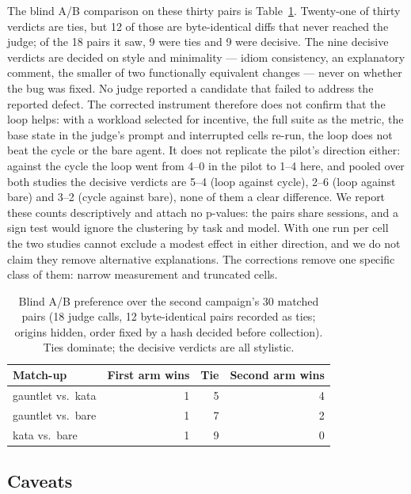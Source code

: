 \documentclass{sbc2019}%
\begin{document}
The blind A/B comparison on these thirty pairs is
Table~\ref{tab:gauntlet-ab-campaign}. Twenty-one of thirty verdicts are ties, but 12 of those are
byte-identical diffs that never reached the judge; of the 18 pairs it saw,
9 were ties and 9 were decisive. The nine decisive verdicts are decided on style and minimality --- idiom
consistency, an explanatory comment, the smaller of two functionally
equivalent changes --- never on whether the bug was fixed. No judge reported a
candidate that failed to address the reported defect. The corrected instrument
therefore does not confirm that the loop helps: with a workload selected for
incentive, the full suite as the metric, the base state in the judge's prompt
and interrupted cells re-run, the loop does not beat the cycle or the bare
agent. It does not replicate the pilot's direction either: against the cycle
the loop went from 4--0 in the pilot to 1--4 here, and pooled over both
studies the decisive verdicts are 5--4 (loop against cycle), 2--6 (loop
against bare) and 3--2 (cycle against bare), none of them a clear
difference. We report these counts descriptively and attach no p-values: the
pairs share sessions, and a sign test would ignore the clustering by task and
model. With one run per cell the
two studies cannot exclude a modest effect in either direction, and we do not
claim they remove alternative explanations. The corrections remove one
specific class of them: narrow measurement and truncated cells.

\begin{table}[!ht]
\caption{Blind A/B preference over the second campaign's 30 matched pairs (18
judge calls, 12 byte-identical pairs recorded as ties; origins hidden, order fixed by a hash decided before
collection). Ties dominate; the decisive verdicts are all stylistic.}
\centering
\footnotesize
\begin{tabular}{@{}lrrr@{}}
\hline\hline
Match-up & First arm wins & Tie & Second arm wins \\
\hline
gauntlet vs.\ kata & 1 & 5 & 4 \\
gauntlet vs.\ bare & 1 & 7 & 2 \\
kata vs.\ bare & 1 & 9 & 0 \\
\hline\hline
\end{tabular}
\label{tab:gauntlet-ab-campaign}
\end{table}

\subsection{Caveats}
\end{document}

